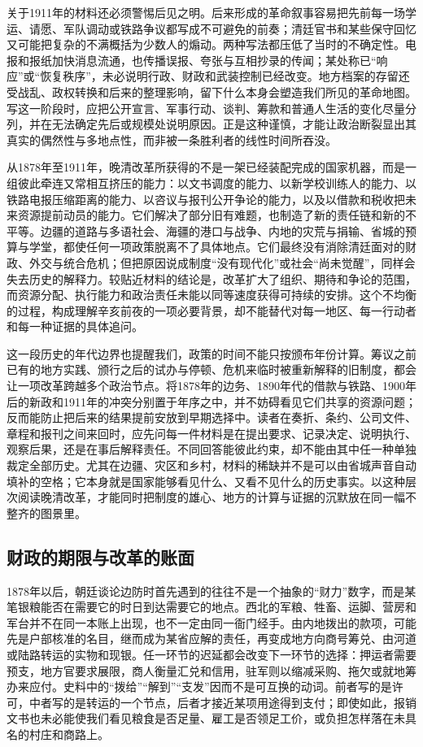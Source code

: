 关于1911年的材料还必须警惕后见之明。后来形成的革命叙事容易把先前每一场学运、请愿、军队调动或铁路争议都写成不可避免的前奏；清廷官书和某些保守回忆又可能把复杂的不满概括为少数人的煽动。两种写法都压低了当时的不确定性。电报和报纸加快消息流通，也传播误报、夸张与互相抄录的传闻；某处称已“响应”或“恢复秩序”，未必说明行政、财政和武装控制已经改变。地方档案的存留还受战乱、政权转换和后来的整理影响，留下什么本身会塑造我们所见的革命地图。写这一阶段时，应把公开宣言、军事行动、谈判、筹款和普通人生活的变化尽量分列，并在无法确定先后或规模处说明原因。正是这种谨慎，才能让政治断裂显出其真实的偶然性与多地点性，而非被一条胜利者的线性时间所吞没。

从1878年至1911年，晚清改革所获得的不是一架已经装配完成的国家机器，而是一组彼此牵连又常相互挤压的能力：以文书调度的能力、以新学校训练人的能力、以铁路电报压缩距离的能力、以咨议与报刊公开争论的能力，以及以借款和税收把未来资源提前动员的能力。它们解决了部分旧有难题，也制造了新的责任链和新的不平等。边疆的道路与多语社会、海疆的港口与战争、内地的灾荒与捐输、省城的预算与学堂，都使任何一项政策脱离不了具体地点。它们最终没有消除清廷面对的财政、外交与统合危机；但把原因说成制度“没有现代化”或社会“尚未觉醒”，同样会失去历史的解释力。较贴近材料的结论是，改革扩大了组织、期待和争论的范围，而资源分配、执行能力和政治责任未能以同等速度获得可持续的安排。这个不均衡的过程，构成理解辛亥前夜的一项必要背景，却不能替代对每一地区、每一行动者和每一种证据的具体追问。

这一段历史的年代边界也提醒我们，政策的时间不能只按颁布年份计算。筹议之前已有的地方实践、颁行之后的试办与停顿、危机来临时被重新解释的旧制度，都会让一项改革跨越多个政治节点。将1878年的边务、1890年代的借款与铁路、1900年后的新政和1911年的冲突分别置于年序之中，并不妨碍看见它们共享的资源问题；反而能防止把后来的结果提前安放到早期选择中。读者在奏折、条约、公司文件、章程和报刊之间来回时，应先问每一件材料是在提出要求、记录决定、说明执行、观察后果，还是在事后解释责任。不同回答能彼此约束，却不能由其中任一种单独裁定全部历史。尤其在边疆、灾区和乡村，材料的稀缺并不是可以由省城声音自动填补的空格；它本身就是国家能够看见什么、又看不见什么的历史事实。以这种层次阅读晚清改革，才能同时把制度的雄心、地方的计算与证据的沉默放在同一幅不整齐的图景里。

\subsection{财政的期限与改革的账面}

1878年以后，朝廷谈论边防时首先遇到的往往不是一个抽象的“财力”数字，而是某笔银粮能否在需要它的时日到达需要它的地点。西北的军粮、牲畜、运脚、营房和军台并不在同一本账上出现，也不一定由同一衙门经手。由内地拨出的款项，可能先是户部核准的名目，继而成为某省应解的责任，再变成地方向商号筹兑、由河道或陆路转运的实物和现银。任一环节的迟延都会改变下一环节的选择：押运者需要预支，地方官要求展限，商人衡量汇兑和信用，驻军则以缩减采购、拖欠或就地筹办来应付。史料中的“拨给”“解到”“支发”因而不是可互换的动词。前者写的是许可，中者写的是转运的一个节点，后者才接近某项用途得到支付；即使如此，报销文书也未必能使我们看见粮食是否足量、雇工是否领足工价，或负担怎样落在未具名的村庄和商路上。

